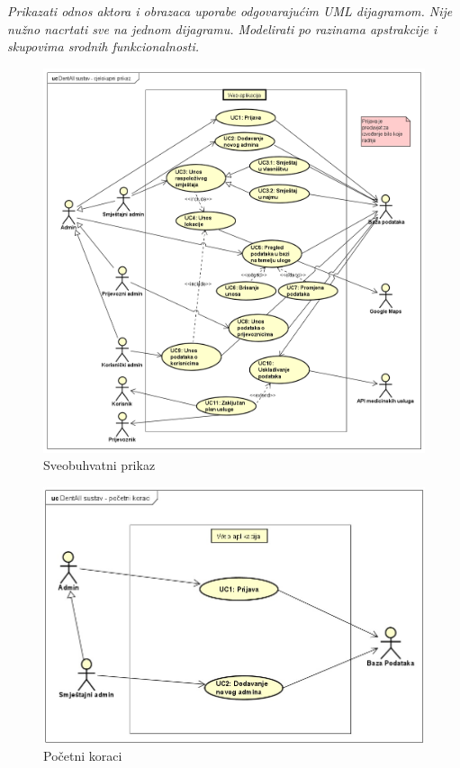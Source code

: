					\textit{Prikazati odnos aktora i obrazaca uporabe odgovarajućim UML dijagramom. Nije nužno nacrtati sve na jednom dijagramu. Modelirati po razinama apstrakcije i skupovima srodnih funkcionalnosti.}
				\eject		
				\begin{figure}[H]
					\includegraphics[width=\linewidth]{slike/Cjelokupni-prikaz-1.PNG} 
					\centering
					\caption{Sveobuhvatni prikaz}
					\label{fig:sveobuhvatniPrikaz}
				\end{figure}
				
				\begin{figure}[H]
					\includegraphics[width=\linewidth]{slike/DentAll_Pocetni-Koraci.PNG} 
					\centering
					\caption{Početni koraci}
					\label{fig:pocetniKoraci}
				\end{figure}
				
